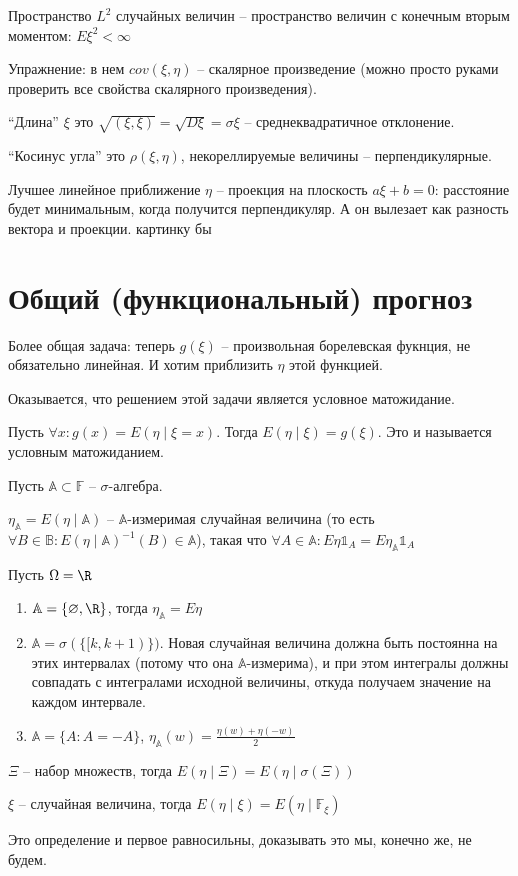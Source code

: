 \begin{Def}
Пространство $L^2$ случайных величин -- пространство величин с конечным вторым моментом: $E \xi^2 < \infty$
\end{Def}

Упражнение: в нем $cov(\xi, \eta)$ -- скалярное произведение (можно просто руками проверить все свойства скалярного произведения).

``Длина'' $\xi$ это $\sqrt{(\xi, \xi)} = \sqrt{D\xi} = \sigma \xi$ -- среднеквадратичное отклонение.

``Косинус угла'' это $\rho(\xi, \eta)$, некореллируемые величины -- перпендикулярные.

Лучшее линейное приближение $\eta$ -- проекция на плоскость $a\xi + b = 0$: расстояние будет минимальным, когда получится перпендикуляр.
А он вылезает как разность вектора и проекции.  \TODO картинку бы \TODO


\section{Общий (функциональный) прогноз}

Более общая задача: теперь $g(\xi)$ -- произвольная борелевская фукнция, не обязательно линейная.
И хотим приблизить $\eta$ этой функцией.    

Оказывается, что решением этой задачи является условное матожидание.

\begin{Def}
Пусть $\forall x\colon g(x) = E(\eta \mid \xi = x)$. Тогда $E(\eta \mid \xi) = g(\xi)$. Это и называется условным матожиданием.
\end{Def}

\begin{Def}
    Пусть $\mathbb{A} \subset \mathbb{F}$ -- $\sigma$-алгебра.

    $\eta_\mathbb{A} = E(\eta \mid \mathbb{A})$ -- $\mathbb{A}$-измеримая случайная величина (то есть $\forall B \in \mathbb{B}\colon E(\eta \mid \mathbb{A})^{-1}(B) \in \mathbb{A}$),
    такая что $\forall A \in \mathbb{A}\colon E\eta \mathbb{1}_A = E\eta_\mathbb{A} \mathbb{1}_A$
\end{Def}
\begin{exmp}
    Пусть $\Omega = \R$
    \begin{enumerate}
    \item
        $\mathbb{A} = \{\varnothing, \R\}$, тогда $\eta_\mathbb{A} = E\eta$
    \item
        $\mathbb{A} = \sigma(\{[k, k + 1)\})$. Новая случайная величина должна быть постоянна на этих интервалах (потому что она $\mathbb{A}$-измерима), 
        и при этом интегралы должны совпадать с интегралами исходной величины, откуда получаем значение на каждом интервале.
    \item   
        $\mathbb{A} = \{A \colon A = -A\}$, $\eta_\mathbb{A}(w) = \frac{\eta(w) + \eta(-w)}{2}$
    \end{enumerate}
\end{exmp}

\begin{Def}
    $\Xi$ -- набор множеств, тогда $E(\eta \mid \Xi) = E(\eta \mid \sigma(\Xi))$

    $\xi$ -- случайная величина, тогда $E(\eta \mid \xi) = E(\eta \mid \mathbb{F}_\xi)$
\end{Def}
\begin{Rem}
    Это определение и первое равносильны, доказывать это мы, конечно же, не будем.
\end{Rem}